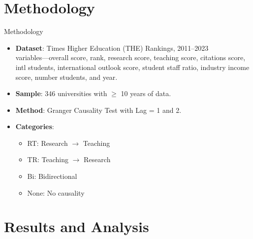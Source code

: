 \documentclass[aspectratio=169, table]{beamer}
\begin{document}
\section{Methodology}

\begin{frame}[fragile]{Methodology}
	\vspace{20pt}
	\begin{itemize}
		\item \textbf{Dataset}: Times Higher Education (THE) Rankings, 2011–2023
		\\variables---overall score, rank,
		research score, teaching score, citations score, intl students,
		international outlook score, student staff ratio, industry income
		score, number students, and year.
		\item \textbf{Sample}: 346 universities with $\geq$ 10 years of data.
		\item \textbf{Method}: Granger Causality Test with Lag = 1 and 2.
		\item \textbf{Categories}:
		\begin{itemize}
			\item RT: Research $\rightarrow$ Teaching
			\item TR: Teaching $\rightarrow$ Research
			\item Bi: Bidirectional
			\item None: No causality
		\end{itemize}
	\end{itemize}
\end{frame}

\section{Results and Analysis}
\end{document}
